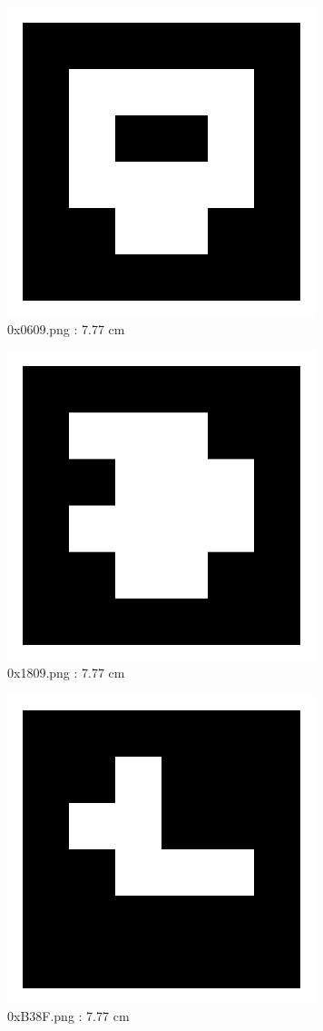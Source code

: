 \documentclass[11pt,a4,BCOR=0cm]{scrartcl}
\begin{document}
\begin{figure}
  \centering
    \includegraphics[natwidth=400,natheight=400,width=9cm]{0x0609.png}
    \caption{0x0609.png : 7.77 cm}
    \label{fig:0x0609.png}
  
\end{figure} 

\clearpage

\begin{figure}
  \centering
    \includegraphics[natwidth=400,natheight=400,width=9cm]{0x1809.png}
    \caption{0x1809.png : 7.77 cm}
    \label{fig:0x1809.png}
  
\end{figure} 

\begin{figure}
  \centering
    \includegraphics[natwidth=400,natheight=400,width=9cm]{0xB38F.png}
    \caption{0xB38F.png : 7.77 cm}
    \label{fig:0xB38F.png}
  
\end{figure} 
\end{document}
